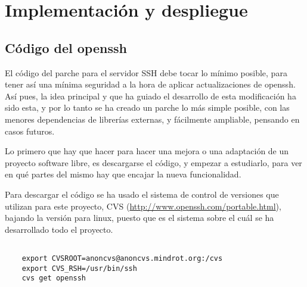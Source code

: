 
\chapter{Implementación y despliegue}
    \label{implementacion}
    \section{Código del openssh}

    El código del parche para el servidor SSH debe tocar lo mínimo posible,
    para tener así una mínima seguridad a la hora de aplicar
    actualizaciones de openssh. Así pues, la idea principal y que ha guiado
    el desarrollo de esta modificación ha sido esta, y por lo tanto se ha
    creado un parche lo más simple posible, con las menores dependencias de
    librerías externas, y fácilmente ampliable, pensando en casos futuros.

    Lo primero que hay que hacer para hacer una mejora o una adaptación de
    un proyecto software libre, es descargarse el código, y empezar a
    estudiarlo, para ver en qué partes del mismo hay que encajar la nueva
    funcionalidad.

    Para descargar el código se ha usado el sistema de control de versiones
    que utilizan para este proyecto, CVS
    (\url{http://www.openssh.com/portable.html}), bajando la versión para
    linux, puesto que es el sistema sobre el cuál se ha desarrollado todo
    el proyecto.
    
    \begin{verbatim}

    export CVSROOT=anoncvs@anoncvs.mindrot.org:/cvs
    export CVS_RSH=/usr/bin/ssh
    cvs get openssh

    \end{verbatim}




